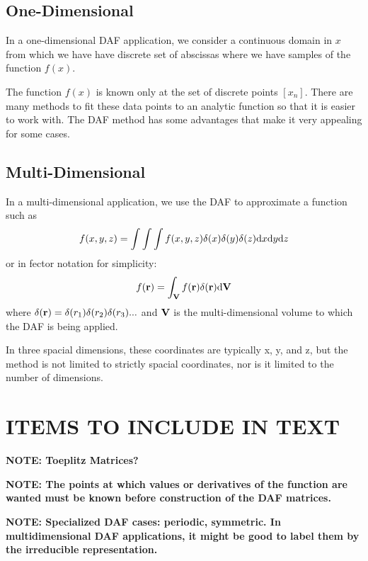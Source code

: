 \documentclass[preprint]{revtex4}
\begin{document}
\subsection{One-Dimensional}
In a one-dimensional DAF application, we consider a continuous domain in $x$ from which
we have have discrete set of abscissas where we have samples of the function $f(x)$. 

The function $f(x)$ is known only at the set of discrete points $[x_n]$.
There are many methods to fit these data points to an analytic function so that it is
easier to work with. The DAF method has some advantages that make it very appealing
for some cases. 


\subsection{Multi-Dimensional}
In a multi-dimensional application, we use the DAF to approximate a function such as
\begin{equation}
f(x,y,z) = \int\int\int f(x,y,z)\delta(x)\delta(y)\delta(z) {\rm d}x {\rm d}y {\rm d}z
\end{equation}
or in fector notation for simplicity: 
\begin{equation}
f({\bf r}) = \int_{\bf V} f({\bf r})\delta({\bf r}){\rm d}{\bf V}
\end{equation}
where $\delta({\bf r}) = \delta(r_1)\delta(r_2)\delta(r_3)...$ and ${\bf V}$ is the
multi-dimensional volume to which the DAF is being applied. 

In three spacial dimensions, these coordinates are typically x, y, and z, but the method is
not limited to strictly spacial coordinates, nor is it limited to the number of
dimensions. 



\section{ITEMS TO INCLUDE IN TEXT}
{\bf NOTE: Toeplitz Matrices?}

{\bf NOTE: The points at which values or derivatives of the function are wanted must be known
before construction of the DAF matrices. }

{\bf NOTE: Specialized DAF cases: periodic, symmetric. In multidimensional DAF applications, 
it might be good to label them by the irreducible representation.}

\appendix






\end{document}
